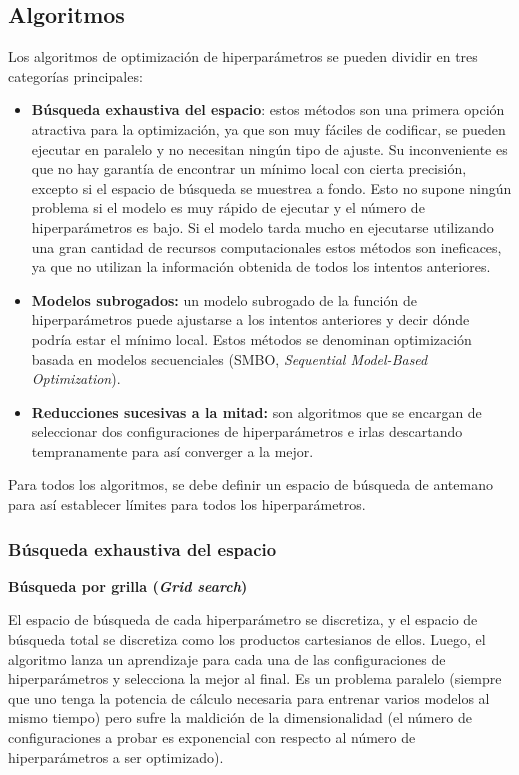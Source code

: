 \documentclass[a4paper,12pt]{article}
\begin{document}
\subsection{Algoritmos} \label{algo-hp}

Los algoritmos de optimización de hiperparámetros se pueden dividir en tres categorías principales:
\begin{itemize}
	\item \textbf{Búsqueda exhaustiva del espacio}: estos métodos son una primera opción atractiva para la optimización, ya que son muy fáciles de codificar, se pueden ejecutar en paralelo y no necesitan ningún tipo de ajuste. Su inconveniente es que no hay garantía de encontrar un mínimo local con cierta precisión, excepto si el espacio de búsqueda se muestrea a fondo. Esto no supone ningún problema si el modelo es muy rápido de ejecutar y el número de hiperparámetros es bajo. Si el modelo tarda mucho en ejecutarse utilizando una gran cantidad de recursos computacionales estos métodos son ineficaces, ya que no utilizan la información obtenida de todos los intentos anteriores.
	\item \textbf{Modelos subrogados:} un modelo subrogado de la función de hiperparámetros puede ajustarse a los intentos anteriores y decir dónde podría estar el mínimo local. Estos métodos se denominan optimización basada en modelos secuenciales (SMBO, \textit{Sequential Model-Based Optimization}).
	\item \textbf{Reducciones sucesivas a la mitad:} son algoritmos que se encargan de seleccionar dos configuraciones de hiperparámetros e irlas descartando tempranamente para así converger a la mejor.
\end{itemize}

Para todos los algoritmos, se debe definir un espacio de búsqueda de antemano para así establecer límites para todos los hiperparámetros.

\subsubsection{Búsqueda exhaustiva del espacio}
\textbf{Búsqueda por grilla (\textit{Grid search})}

El espacio de búsqueda de cada hiperparámetro se discretiza, y el espacio de búsqueda total se discretiza como los productos cartesianos de ellos. Luego, el algoritmo lanza un aprendizaje para cada una de las configuraciones de hiperparámetros y selecciona la mejor al final. Es un problema paralelo (siempre que uno tenga la potencia de cálculo necesaria para entrenar varios modelos al mismo tiempo) pero sufre la maldición de la dimensionalidad (el número de configuraciones a probar es exponencial con respecto al número de hiperparámetros a ser optimizado).
\end{document}
